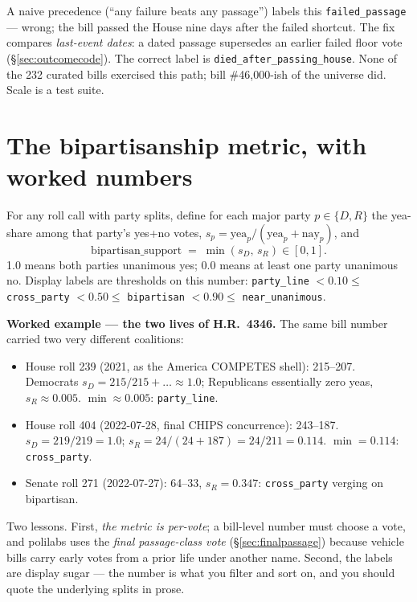 \documentclass[11pt]{article}
\newcommand{\code}[1]{\texttt{#1}}
\begin{document}
A naive precedence (``any failure beats any passage'') labels this
\code{failed\_passage} --- wrong; the bill passed the House nine days after
the failed shortcut. The fix compares \emph{last-event dates}: a dated
passage supersedes an earlier failed floor vote
(\S\ref{sec:outcomecode}). The correct label is
\code{died\_after\_passing\_house}. None of the 232 curated bills exercised
this path; bill \#46{,}000-ish of the universe did. Scale is a test suite.

\section{The bipartisanship metric, with worked numbers}
\label{sec:bipartisan}

For any roll call with party splits, define for each major party
$p \in \{D, R\}$ the yea-share among that party's yes+no votes,
$s_p = \text{yea}_p / (\text{yea}_p + \text{nay}_p)$, and
\[
\text{bipartisan\_support} \;=\; \min(s_D,\, s_R) \in [0,1].
\]
1.0 means both parties unanimous yes; 0.0 means at least one party unanimous
no. Display labels are thresholds on this number: \code{party\_line} $<0.10
\le$ \code{cross\_party} $< 0.50 \le$ \code{bipartisan} $< 0.90 \le$
\code{near\_unanimous}.

\textbf{Worked example --- the two lives of H.R.~4346.} The same bill number
carried two very different coalitions:

\begin{itemize}[itemsep=2pt]
  \item House roll 239 (2021, as the America COMPETES shell): 215--207.
        Democrats $s_D = 215/215{+}\ldots \approx 1.0$; Republicans
        essentially zero yeas, $s_R \approx 0.005$. $\min \approx 0.005$:
        \code{party\_line}.
  \item House roll 404 (2022-07-28, final CHIPS concurrence): 243--187.
        $s_D = 219/219 = 1.0$; $s_R = 24/(24{+}187) = 24/211 = 0.114$.
        $\min = 0.114$: \code{cross\_party}.
  \item Senate roll 271 (2022-07-27): 64--33, $s_R = 0.347$:
        \code{cross\_party} verging on bipartisan.
\end{itemize}

Two lessons. First, \emph{the metric is per-vote}; a bill-level number must
choose a vote, and polilabs uses the \emph{final passage-class vote}
(\S\ref{sec:finalpassage}) because vehicle bills carry early votes from a
prior life under another name. Second, the labels are display sugar --- the
number is what you filter and sort on, and you should quote the underlying
splits in prose.
\end{document}
